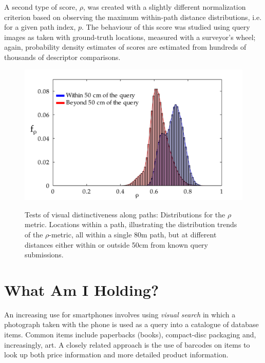 A second type of score, $\rho$, was created with a slightly different normalization criterion based on observing the maximum within-path distance distributions, i.e. for a given path index, $p$.  The behaviour of this score was studied using query images as taken with ground-truth locations, measured with a surveyor's wheel; again, probability density estimates of scores are estimated from hundreds of thousands of descriptor comparisons.


\begin{figure}[ht]
\centering
{\includegraphics[width=\linewidth]{./gfx/Chapter02/C5distributions_no_smoothingWithSmoothedHistograms-latex.pdf}}
\caption{Tests of visual distinctiveness along paths: Distributions for the $\rho$ metric. Locations within a path, illustrating the distribution trends of the $\rho$-metric, all within a single 80m path, but at different distances either within or outside 50cm from known query submissions.}        
\label{fig:rhoDistribution}
\end{figure}



\section{What Am I Holding?}

An increasing use for smartphones involves using {\it visual search} in which a photograph taken with the phone is used as a query into a catalogue of database items.  Common items include paperbacks (books), compact-disc packaging and, increasingly, art.  A closely related approach is the use of barcodes on items to look up both price information and more detailed product information.  

